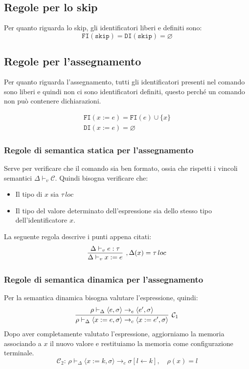 \documentclass[oneside,a4paper,11pt]{book}
\theoremstyle{italicstyle}
\theoremstyle{normStyle}
\begin{document}
\subsection{Regole per lo skip}
Per quanto riguarda lo skip, gli identificatori liberi e definiti sono:
\[
  \texttt{FI}(\texttt{skip})=\texttt{DI}(\texttt{skip})=\varnothing
\]
\subsection{Regole per l'assegnamento}
Per quanto riguarda l'assegnamento, tutti gli identificatori presenti nel comando 
sono liberi e quindi non ci sono identificatori definiti, questo perché un comando
non può contenere dichiarazioni.

  \begin{align*}
    \texttt{FI}(x:=e) = \texttt{FI}(e) \cup \{x\} \\
    \texttt{DI}(x:=e)= \varnothing
  \end{align*}
\subsubsection{Regole di semantica statica per l'assegnamento}
Serve per verificare che il comando sia ben formato, ossia che rispetti i vincoli 
semantici $\Delta \vdash_v \mathcal{C}$. Quindi bisogna verificare che:
\begin{itemize}
  \item Il tipo di $x$ sia $\tau\,loc$
  \item Il tipo del valore determinato dell'espressione sia dello stesso tipo dell'identificatore
  $x$.
\end{itemize}
La seguente regola descrive i punti appena citati:
\[
  \infer[ , \Delta(x) = \tau \, loc]
    {
      \Delta \vdash_v x:=e
    }
    {
      \Delta \vdash_v e: \tau
    }
\]
\subsubsection{Regole di semantica dinamica per l'assegnamento}
Per la semantica dinamica bisogna valutare l'espressione, quindi:
\[
  \infer[\mathcal{C}_1]
  {
    \rho \vdash_\Delta \langle x:=e,\sigma\rangle \rightarrow_c \langle x:=e',\sigma\rangle
    }
  {
    \rho \vdash_\Delta \langle e,\sigma \rangle \rightarrow_e \langle e',\sigma \rangle
  }
\]
Dopo aver completamente valutato l'espressione, aggiorniamo la memoria 
associando a $x$ il nuovo valore e restituiamo la memoria come configurazione terminale.
\[
  \mathcal{C}_2 : \, \rho \vdash_\Delta \langle x:=k,\sigma \rangle \rightarrow_c \sigma[l \leftarrow k],\quad\rho(x)=l
\]
\end{document}
